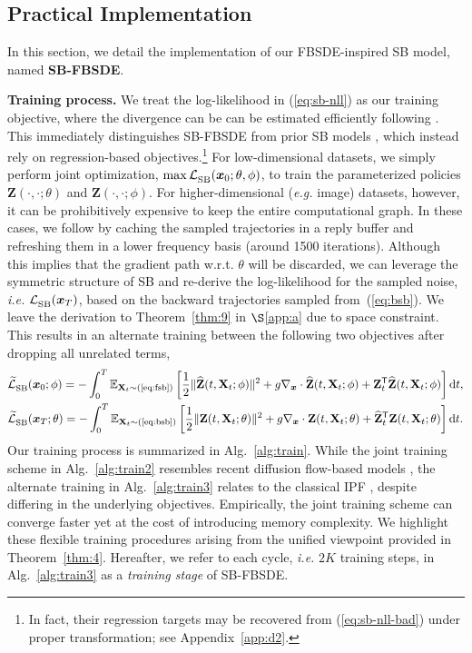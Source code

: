 \documentclass{article}
\def\eqref#1{(\ref{#1})}
\def\rvX{{\mathbf{X}}}
\def\rvZ{{\mathbf{Z}}}
\def\vx{{\bm{x}}}
\newcommand{\E}{\mathbb{E}}
\newcommand{\norm}[1]{\lVert#1\rVert}
\def\dt{{ \mathrm{d} t }}
\newcommand{\br}[1]{\left[#1\right]}
\newcommand{\T}{\mathsf{T}}
\newcommand{\eg}{{\ignorespaces\emph{e.g.}}{ }}
\newcommand{\ie}{{\ignorespaces\emph{i.e.}}{ }}
\begin{document}
{
\vspace{-2pt}
\subsection{Practical Implementation} \label{sec:3.3}
\vspace{-2pt}

In this section, we detail the implementation of our FBSDE-inspired SB model, named \textbf{SB-FBSDE}.

\textbf{Training process.}
We treat the log-likelihood in \eqref{eq:sb-nll} as our training objective,
where the divergence can be can be estimated efficiently following \citet{hutchinson1989stochastic}.
This immediately distinguishes SB-FBSDE from prior SB models \citep{de2021diffusion,vargas2021solving}, which instead rely on regression-based objectives.\footnote{
  In fact, their regression targets may be recovered from \eqref{eq:sb-nll-bad} under proper transformation; see Appendix~\ref{app:d2}.
}
For low-dimensional datasets, we simply perform joint optimization, $\max \LSB(\vx_0; \theta, \phi)$, to train the parameterized policies $\rvZ(\cdot,\cdot; \theta)$ and $\widehat{\rvZ}(\cdot,\cdot; \phi)$.
For higher-dimensional (\eg image) datasets, however, it can be prohibitively expensive to keep the entire computational graph.
In these cases, we follow \citet{de2021diffusion} by caching the sampled trajectories in a reply buffer and refreshing them
in a lower frequency basis (around 1500 iterations).
Although this implies that the gradient path w.r.t. $\theta$ will be discarded,
we can leverage the symmetric structure of SB
and re-derive the log-likelihood for the sampled noise, \ie $\LSB(\vx_T)$, based on the backward trajectories sampled from~\eqref{eq:bsb}.
We leave the derivation to Theorem~\ref{thm:9} in $\S$\ref{app:a} due to space constraint.
This results in an alternate training between the following two objectives after dropping all unrelated terms,
  \begin{align}
      &\LSBB(\vx_0; \phi)
      = - \int_0^T \E_{\rvX_t\sim\text{\eqref{eq:fsb}}}\br{\frac{1}{2} \norm{\widehat{\rvZ}(t,\rvX_t;\phi)}^2  + g \nabla_\vx \cdot \widehat{\rvZ}(t,\rvX_t;\phi) + {\rvZ}_t^\T\widehat{\rvZ}(t,\rvX_t;\phi) } \dt, \label{eq:high-dim-loss} \\
      &\LSBB(\vx_T; \theta)
      = - \int_0^T \E_{\rvX_t\sim\text{\eqref{eq:bsb}}}\br{\frac{1}{2} \norm{\rvZ(t,\rvX_t;\theta)}^2 + g \nabla_\vx \cdot {\rvZ}(t,\rvX_t;\theta) + \widehat{\rvZ}^\T_t{\rvZ}(t,\rvX_t;\theta)} \dt. \label{eq:high-dim-loss2}
  \end{align}
Our training process is summarized in Alg.~\ref{alg:train}.
While the joint training scheme in Alg.~\ref{alg:train2} resembles recent {diffusion} flow-based models \citep{zhang2021diffusion},
the alternate training in Alg.~\ref{alg:train3} relates to the classical IPF \citep{de2021diffusion}, despite differing in the underlying objectives.
Empirically, the joint training scheme can converge faster yet at the cost of introducing memory complexity.
We highlight these flexible training procedures arising from the unified viewpoint provided in Theorem~\ref{thm:4}.
Hereafter, we refer to
each cycle, \ie $2K$ training steps, in Alg.~\ref{alg:train3} as a \textit{training stage} of SB-FBSDE.

}
\end{document}
